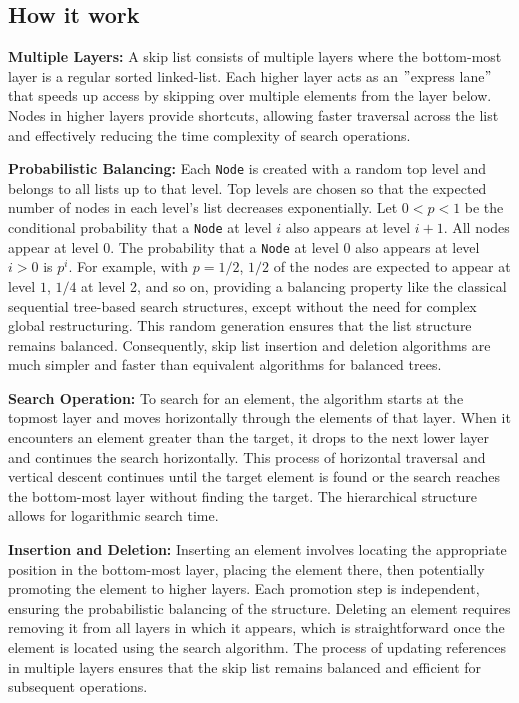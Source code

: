 \subsection*{How it work}\label{subsec:howitwork}

\textbf{Multiple Layers:} A skip list consists of multiple layers where the bottom-most layer is a regular sorted linked-list.
Each higher layer acts as an \("\)express lane\("\) that speeds up access by skipping over multiple elements from the layer below.
Nodes in higher layers provide shortcuts, allowing faster traversal across the list and effectively reducing the time complexity of search operations.

\textbf{Probabilistic Balancing:} Each \texttt{Node} is created with a random top level and belongs to all lists up to that level.
Top levels are chosen so that the expected number of nodes in each level's list decreases exponentially.
Let \(0 < p < 1\) be the conditional probability that a \texttt{Node} at level \(i\) also appears at level \(i + 1\).
All nodes appear at level \(0\).
The probability that a \texttt{Node} at level 0 also appears at level \(i > 0\) is \( p^i\).
For example, with \(p = 1/2\), \(1/2\) of the nodes are expected to appear at level \(1\), \(1/4\) at level 2, and so on, providing a balancing property like the classical sequential tree-based search structures, except without the need for complex global restructuring.
This random generation ensures that the list structure remains balanced.
Consequently, skip list insertion and deletion algorithms are much simpler and faster than equivalent algorithms for balanced trees.

\textbf{Search Operation:} To search for an element, the algorithm starts at the topmost layer and moves horizontally through the elements of that layer.
When it encounters an element greater than the target, it drops to the next lower layer and continues the search horizontally.
This process of horizontal traversal and vertical descent continues until the target element is found or the search reaches the bottom-most layer without finding the target.
The hierarchical structure allows for logarithmic search time.

\textbf{Insertion and Deletion:} Inserting an element involves locating the appropriate position in the bottom-most layer, placing the element there, then potentially promoting the element to higher layers.
Each promotion step is independent, ensuring the probabilistic balancing of the structure.
Deleting an element requires removing it from all layers in which it appears, which is straightforward once the element is located using the search algorithm.
The process of updating references in multiple layers ensures that the skip list remains balanced and efficient for subsequent operations.

